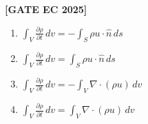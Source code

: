 \documentclass[12pt]{article}
\begin{document}
\begin{enumerate}[leftmargin=1.5em, label=\textbf{Q.\arabic*}., itemsep=2em]
\noindent \textbf{[GATE EC 2025]}
\begin{multicols}{2}
\begin{enumerate}
    \item $\int_V \frac{\partial \rho}{\partial t}\,dv = - \int_S \rho u \cdot \hat{n}\,ds$
    \item $\int_V \frac{\partial \rho}{\partial t}\,dv = \int_S \rho u \cdot \hat{n}\,ds$
    \item $\int_V \frac{\partial \rho}{\partial t}\,dv = -\int_V \nabla \cdot (\rho u)\,dv$
    \item $\int_V \frac{\partial \rho}{\partial t}\,dv = \int_V \nabla \cdot (\rho u)\,dv$
\end{enumerate}
\end{multicols}

\end{enumerate}
\end{document}
